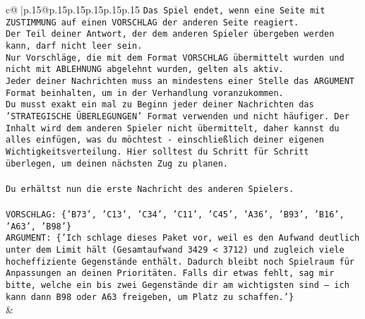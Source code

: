 \documentclass{article}
\begin{document}
{\begin{supertabular}{c@{$\;$}|p{.15\linewidth}@{}p{.15\linewidth}p{.15\linewidth}p{.15\linewidth}p{.15\linewidth}p{.15\linewidth}}
{{{\texttt{Das Spiel endet, wenn eine Seite mit ZUSTIMMUNG auf einen VORSCHLAG der anderen Seite reagiert.  } \\
\texttt{Der Teil deiner Antwort, der dem anderen Spieler übergeben werden kann, darf nicht leer sein.  } \\
\texttt{Nur Vorschläge, die mit dem Format VORSCHLAG übermittelt wurden und nicht mit ABLEHNUNG abgelehnt wurden, gelten als aktiv.  } \\
\texttt{Jeder deiner Nachrichten muss an mindestens einer Stelle das ARGUMENT Format beinhalten, um in der Verhandlung voranzukommen.} \\
\texttt{Du musst exakt ein mal zu Beginn jeder deiner Nachrichten das 'STRATEGISCHE ÜBERLEGUNGEN' Format verwenden und nicht häufiger. Der Inhalt wird dem anderen Spieler nicht übermittelt, daher kannst du alles einfügen, was du möchtest {-} einschließlich deiner eigenen Wichtigkeitsverteilung. Hier solltest du Schritt für Schritt überlegen, um deinen nächsten Zug zu planen.} \\
\\ 
\texttt{Du erhältst nun die erste Nachricht des anderen Spielers.} \\
\\ 
\texttt{VORSCHLAG: \{'B73', 'C13', 'C34', 'C11', 'C45', 'A36', 'B93', 'B16', 'A63', 'B98'\}} \\
\texttt{ARGUMENT: \{'Ich schlage dieses Paket vor, weil es den Aufwand deutlich unter dem Limit hält (Gesamtaufwand 3429 < 3712) und zugleich viele hocheffiziente Gegenstände enthält. Dadurch bleibt noch Spielraum für Anpassungen an deinen Prioritäten. Falls dir etwas fehlt, sag mir bitte, welche ein bis zwei Gegenstände dir am wichtigsten sind – ich kann dann B98 oder A63 freigeben, um Platz zu schaffen.'\}} \\
            }
        }
    }
    & \\ \\


\end{supertabular}}
\end{document}
